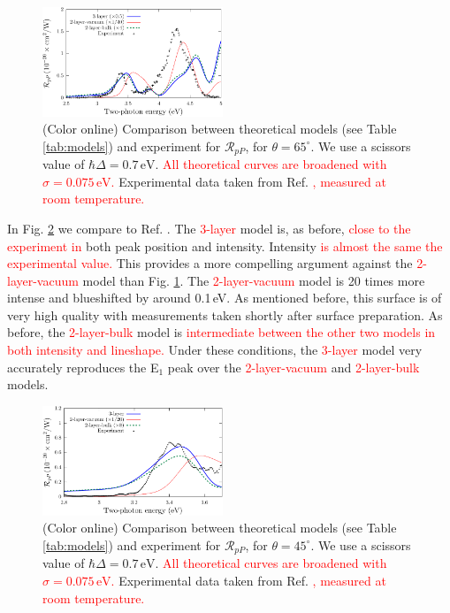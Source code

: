\documentclass[prb,superscriptaddress,showpacs,twocolumn,letterpaper]{revtex4}
\newcommand{\correction}[1]{\textcolor{red}{#1}}
\newcommand{\change}[1]{\textcolor{red}{#1}}
\begin{document}
\begin{figure}[b]
\centering 
\includegraphics[width=0.48\textwidth]{fig7}
\caption{(Color online) Comparison between theoretical models (see Table 
\ref{tab:models}) and experiment for $\mathcal{R}_{pP}$, for 
$\theta=65^{\circ}$. We use a scissors value of $\hbar\Delta = 0.7\,\text{eV}$. 
\correction{All theoretical curves are broadened with $\sigma=0.075\,\text{eV}$.
} %
Experimental data taken from Ref. 
\correction{, measured at room temperature.} %
\label{fig:RpP}}
\end{figure}

In Fig. \ref{fig:mitchellRpP} we compare to Ref.
. The \correction{3-layer} model is, as before,
\change{close to the experiment in} %
both peak position and intensity. Intensity 
\change{is almost the same the experimental value.} %
This provides a more compelling argument against the
\correction{2-layer-vacuum} model than Fig.
\ref{fig:RpP}. The \correction{2-layer-vacuum} model is 20 times more intense
and blueshifted by around 0.1\,eV. As mentioned before, this surface is of very
high quality with measurements taken shortly after surface preparation. As
before, the \correction{2-layer-bulk} model is
\change{intermediate between the other two models in both intensity and
lineshape.} %
Under these conditions, the \correction{3-layer} model very accurately
reproduces the E$_{1}$ peak over the \correction{2-layer-vacuum} and
\correction{2-layer-bulk} models.

\begin{figure}[t]
\centering
\includegraphics[width=0.48\textwidth]{fig8}
\caption{(Color online) Comparison between theoretical models (see Table
\ref{tab:models}) and experiment for $\mathcal{R}_{pP}$, for
$\theta=45^{\circ}$. We use a scissors value of $\hbar\Delta = 0.7\,\text{eV}$.
\correction{All theoretical curves are broadened with $\sigma=0.075\,\text{eV}$.
} %
Experimental data taken from Ref.
\correction{, measured at room temperature.} %
\label{fig:mitchellRpP}}
\end{figure}
\end{document}
